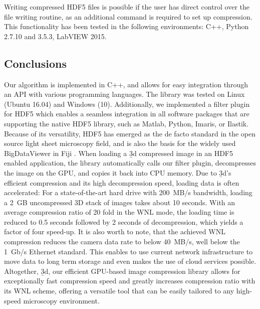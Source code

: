 Writing compressed HDF5 files is possible if the user has direct control over the file writing routine, as an additional command is required to set up compression. This functionality has been tested in the following environments: C++, Python 2.7.10 and 3.5.3, LabVIEW 2015.




\subsection{Conclusions}

Our algorithm is implemented in C++, and allows for easy integration through an API with various programming languages. The library was tested on Linux (Ubuntu 16.04) and Windows (10). Additionally, we implemented a filter plugin for HDF5 which enables a seamless integration in all software packages that are supporting the native HDF5 library, such as Matlab, Python, Imaris, or Ilastik. Because of its versatility, HDF5 has emerged as the de facto standard in the open source light sheet microscopy field, and is also the basis for the widely used BigDataViewer \cite{pietzsch_bigdataviewer:_2015} in Fiji \cite{schindelin_fiji:_2012}. When loading a \b3d compressed image in an HDF5 enabled application, the library automatically calls our filter plugin, decompresses the image on the GPU, and copies it back into CPU memory. Due to \b3d’s efficient compression and its high decompression speed, loading data is often accelerated: For a state-of-the-art hard drive with \SI{200}{MB/s} bandwidth, loading a \SI{2}{GB} uncompressed 3D stack of images takes about 10 seconds. With an average compression ratio of 20 fold in the WNL mode, the loading time is reduced to 0.5 seconds followed by 2 seconds of decompression, which yields a factor of four speed-up. It is also worth to note, that the achieved WNL compression reduces the camera data rate to below \SI{40}{MB/s}, well below the \SI{1}{Gb/s} Ethernet standard. This enables to use current network infrastructure to move data to long term storage and even makes the use of cloud services possible. Altogether, \b3d, our efficient GPU-based image compression library allows for exceptionally fast compression speed and greatly increases compression ratio with its WNL scheme, offering a versatile tool that can be easily tailored to any high-speed microscopy environment.